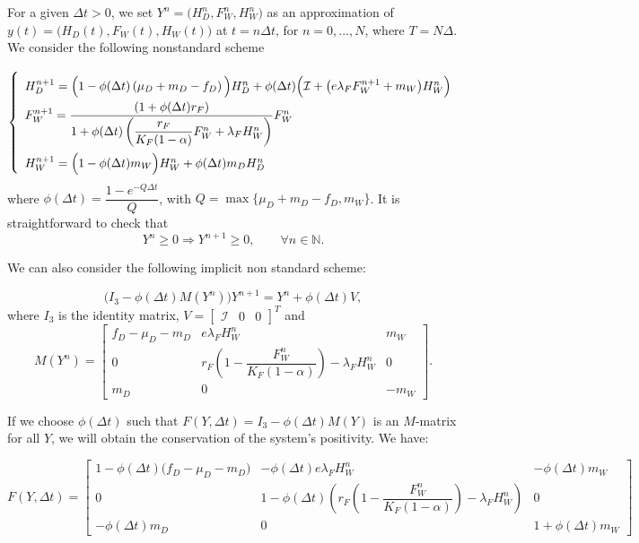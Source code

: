 \documentclass{article}
\newcommand{\lfw}{\lambda_{F}}
\newcommand{\lfw}{\lambda_{F}}
\newcommand{\cI}{\mathcal{I}}
\begin{document}
For a given $\Delta t>0$, we set $Y^n=\Big(H_D^n,F_W^n,H_W^n \Big)$ as an approximation of $y(t)=\Big(H_D(t),F_W(t),H_W(t)\Big)$ at $t=n\Delta t$, for $n=0,...,N$, where $T=N\Delta$. We consider the following nonstandard scheme

\begin{equation}
\def\arraystretch{2}
\left\{ \begin{array}{l}
H_{D}^{n+1}=\Big(1-\phi(\Delta t) \left(\mu_{D}+m_{D}-f_{D}\right)\Big)H_{D}^{n}+ \phi(\Delta t)\Big(\cI+ \big(e\lambda_{F}F_{W}^{n+1} + m_{W}\big)H_{W}^{n}\Big)\\
F_{W}^{n+1}=\dfrac{\left(1+\phi(\Delta t)r_{F}\right)}{1+\phi(\Delta t)\left(\dfrac{r_{F}}{K_{F}(1-\alpha)}F_{W}^{n}+\lambda_{F}H_{W}^{n}\right)}F_{W}^{n}\\ 
H_{W}^{n+1}=\Big(1-\phi(\Delta t)m_{W}\Big)H_{W}^n+\phi(\Delta t)m_{D}H_{D}^n
\end{array}\right.
\end{equation}
where $\phi(\Delta t)=\dfrac{1-e^{-Q\Delta t}}{Q}$, with $Q=\max\{\mu_D+m_D-f_D,m_W\}$. 
It is straightforward to check that
$$
Y^n \geq 0 \Rightarrow Y^{n+1}\geq 0,\qquad \forall n\in \mathbb{N}.
$$

We can also consider the following implicit non standard scheme:

\begin{equation} \label{NSImplicit scheme}
\Big(I_3 - \phi(\Delta t) M(Y^n) \Big) Y^{n+1} = Y^{n} + \phi(\Delta t)V,
\end{equation}
where $I_3$ is the identity matrix, $V = \begin{bmatrix}
\cI & 0 & 0
\end{bmatrix}^T$ and 
\begin{equation}
M(Y^n) = \begin{bmatrix}
f_D - \mu_D - m_D & e \lfw H_W^n & m_W \\
0 & r_F\left(1 - \dfrac{F_W^n}{K_F(1 - \alpha)} \right) - \lfw H_W^n & 0 \\
m_D & 0 & -m_W
\end{bmatrix}.
\end{equation}


If we choose $\phi(\Delta t)$ such that $F(Y, \Delta t) = I_3 - \phi(\Delta t) M(Y) $ is an $M$-matrix for all $Y$, we will obtain the conservation of the system's positivity. We have:

\begin{equation}
F(Y, \Delta t) = \begin{bmatrix}
1 - \phi(\Delta t) \Big(f_D - \mu_D - m_D\Big) & - \phi(\Delta t) e \lfw H_W^n & -\phi(\Delta t) m_W \\
0 & 1 - \phi(\Delta t) \left(r_F\left(1 - \dfrac{F_W^n}{K_F(1 - \alpha)} \right) - \lfw H_W^n \right)& 0 \\
-\phi(\Delta t) m_D & 0 & 1 + \phi(\Delta t) m_W
\end{bmatrix}
\end{equation}
\end{document}
